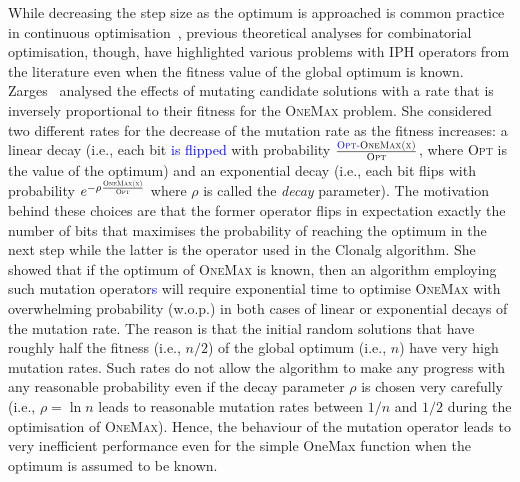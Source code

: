 \documentclass[lettersize,journal]{IEEEtran}
\newcommand{\new}[1]{\textcolor{blue}{#1}}
\begin{document}
While decreasing the step size as the optimum is approached is common practice in continuous optimisation~\cite{AugerDoerrBook}, previous theoretical analyses for combinatorial optimisation, though, have highlighted various problems with %
IPH operators from the literature even when the fitness value of the global optimum is known.
Zarges~ \cite{Zarges2008} analysed the effects of mutating candidate solutions with a rate that is inversely proportional to their fitness for the \textsc{OneMax} problem.
She considered two different rates for the decrease of the mutation rate as the fitness increases: a linear decay (i.e., each bit \new{is flipped} with probability $\frac{\textsc{{\color{blue}\text{Opt}-}OneMax(x)}}{\textsc{Opt}}$, where \textsc{Opt} is the value of the optimum) 
and an exponential decay (i.e., each bit flips with probability $e^{- \rho \frac{\textsc{OneMax(x)}}{\textsc{Opt}}}$ where $\rho$ is called the {\it decay} parameter).
The motivation behind these choices are that the former operator flips in expectation exactly the number of bits that maximises the probability of reaching the optimum in the next step while the latter is the
operator used in the Clonalg algorithm.  
She showed that if the optimum of \textsc{OneMax} is known, then an algorithm employing such mutation operator\new{s} will require exponential time to optimise \textsc{OneMax} with overwhelming probability (w.o.p.)
in both cases of linear or exponential decays of the mutation rate.
The reason is that the initial random solutions that have roughly half the fitness (i.e., $n/2$) of the global optimum (i.e., $n$) have very high mutation rates. Such rates do not allow the algorithm to make any progress with any reasonable probability even if the decay parameter $\rho$ is chosen very carefully (i.e., $\rho = \ln n$ leads to reasonable mutation rates between $1/n$ and $1/2$ %
during the optimisation of \textsc{OneMax}).
Hence, the behaviour of the mutation operator leads to very inefficient performance even for the simple OneMax function when the optimum is assumed to be known. 
\end{document}
